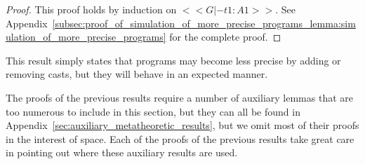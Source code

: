 \begin{proof}
  This proof holds by induction on $<<G |- t1 : A1>>$.  See
  Appendix~\ref{subsec:proof_of_simulation_of_more_precise_programs_lemma:simulation_of_more_precise_programs}
  for the complete proof.
\end{proof}
\noindent
This result simply states that programs may become less precise by
adding or removing casts, but they will behave in an expected manner.

The proofs of the previous results require a number of auxiliary
lemmas that are too numerous to include in this section, but they can
all be found in Appendix~\ref{sec:auxiliary_metatheoretic_results},
but we omit most of their proofs in the interest of space.  Each of
the proofs of the previous results take great care in pointing out
where these auxiliary results are used.


